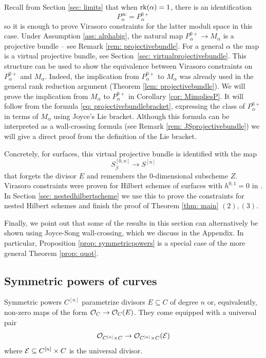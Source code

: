 \documentclass[a4paper, 12pt]{amsart}
\begin{document}
Recall from Section \ref{sec: limits} that when $\mathrm{rk}(\alpha)=1$, there is an identification $$P_\alpha^\infty=P_\alpha^{0+}$$
so it is enough to prove Virasoro constraints for the latter moduli space in this case. Under Assumption \ref{ass: alphabig}, the natural map $P_{\alpha}^{0+}\to M_{\alpha}$ is a projective bundle -- see Remark \ref{rem: projectivebundle}. For a general $\alpha$ the map is a virtual projective bundle, see Section~\ref{sec: virtualprojectivebundle}. This structure can be used to show the equivalence between Virasoro constraints on $P_\alpha^{0+}$ and $M_\alpha$. Indeed, the implication from $P_\alpha^{0+}$ to $M_\alpha$ was already used in the general rank reduction argument (Theorem \ref{lem: projectivebundle}). We will prove the implication from $M_\alpha$ to $P_{\alpha}^{0+}$ in Corollary \ref{cor: MimpliesP}. It will follow from the formula \eqref{eq: projectivebundlebracket}, expressing the class of $P_{\alpha}^{0+}$ in terms of $M_\alpha$ using Joyce's Lie bracket. Although this formula can be interpreted as a wall-crossing formula (see Remark \ref{rem: JSprojectivebundle}) we will give a direct proof from the definition of the Lie bracket.

Concretely, for surfaces, this virtual projective bundle is identified with the map
\[S_\beta^{[0,n]}\to S^{[n]}\]
that forgets the divisor $E$ and remembers the $0$-dimensional subscheme $Z$. Virasoro constraints were proven for Hilbert schemes of surfaces with $h^{0,1}=0$ in \cite{moreira,moop}. In Section \ref{sec: nestedhilbertscheme} we use this to prove the constraints for nested Hilbert schemes and finish the proof of Theorem \ref{thm: main} $(2),(3)$. 

Finally, we point out that some of the results in this section can alternatively be shown using Joyce-Song wall-crossing, which we discuss in the Appendix. In particular, Proposition \ref{prop: symmetricpowers} is a special case of the more general Theorem \ref{prop: quot}.


\subsection{Symmetric powers of curves}
\label{sec: symmetricpowers}
Symmetric powers $C^{[n]}$ parametrize divisors $E\subseteq C$ of degree $n$ or, equivalently, non-zero maps of the form ${\mathcal O}_C\to {\mathcal O}_C(E)$. They come equipped with a universal pair
\[{\mathcal O}_{C^{[n]}\times C}\to {\mathcal O}_{C^{[n]}\times C}( {\mathcal E})\]
where ${\mathcal E}\subseteq C^{[n]}\times C$ is the universal divisor.
\end{document}
